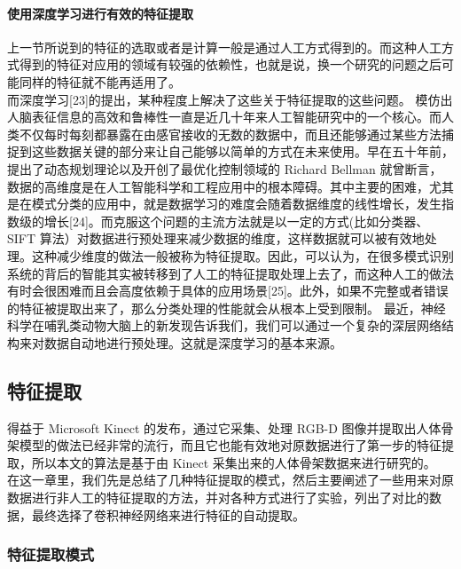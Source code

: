 \paragraph{使用深度学习进行有效的特征提取}\label{ux4f7fux7528ux6df1ux5ea6ux5b66ux4e60ux8fdbux884cux6709ux6548ux7684ux7279ux5f81ux63d0ux53d6}

上一节所说到的特征的选取或者是计算一般是通过人工方式得到的。而这种人工方式得到的特征对应用的领域有较强的依赖性，也就是说，换一个研究的问题之后可能同样的特征就不能再适用了。\\而深度学习{[}23{]}的提出，某种程度上解决了这些关于特征提取的这些问题。
模仿出人脑表征信息的高效和鲁棒性一直是近几十年来人工智能研究中的一个核心。而人类不仅每时每刻都暴露在由感官接收的无数的数据中，而且还能够通过某些方法捕捉到这些数据关键的部分来让自己能够以简单的方式在未来使用。早在五十年前，提出了动态规划理论以及开创了最优化控制领域的
Richard Bellman
就曾断言，数据的高维度是在人工智能科学和工程应用中的根本障碍。其中主要的困难，尤其是在模式分类的应用中，就是数据学习的难度会随着数据维度的线性增长，发生指数级的增长{[}24{]}。而克服这个问题的主流方法就是以一定的方式(比如分类器、SIFT
算法）对数据进行预处理来减少数据的维度，这样数据就可以被有效地处理。这种减少维度的做法一般被称为特征提取。因此，可以认为，在很多模式识别系统的背后的智能其实被转移到了人工的特征提取处理上去了，而这种人工的做法有时会很困难而且会高度依赖于具体的应用场景{[}25{]}。此外，如果不完整或者错误的特征被提取出来了，那么分类处理的性能就会从根本上受到限制。
最近，神经科学在哺乳类动物大脑上的新发现告诉我们，我们可以通过一个复杂的深层网络结构来对数据自动地进行预处理。这就是深度学习的基本来源。

\subsection{特征提取}\label{ux7279ux5f81ux63d0ux53d6}

得益于 Microsoft Kinect 的发布，通过它采集、处理 RGB-D
图像并提取出人体骨架模型的做法已经非常的流行，而且它也能有效地对原数据进行了第一步的特征提取，所以本文的算法是基于由
Kinect
采集出来的人体骨架数据来进行研究的。\\在这一章里，我们先是总结了几种特征提取的模式，然后主要阐述了一些用来对原数据进行非人工的特征提取的方法，并对各种方式进行了实验，列出了对比的数据，最终选择了卷积神经网络来进行特征的自动提取。

\subsubsection{特征提取模式}\label{ux7279ux5f81ux63d0ux53d6ux6a21ux5f0f}

